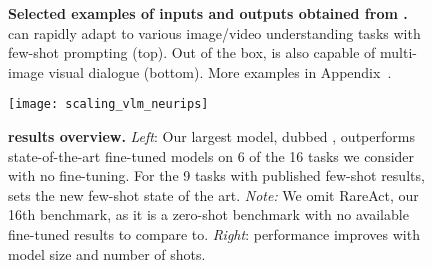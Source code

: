 \begin{figure}
{\begin{minipage}[b]{0.45\textwidth}
\end{minipage}
\begin{minipage}[b]{0.45\textwidth}
\begin{teaserdialogueenvelope}
\chatsep{}
\chatsep{}
\chatsep{}
\chatsep{}
\chatsep{}
\end{teaserdialogueenvelope}
\end{minipage}

}

\centering
\caption{\textbf{Selected examples of inputs and outputs obtained from \largemfull{}.}
\largem{} can rapidly adapt to various image/video understanding tasks with few-shot prompting (top).
Out of the box, \largem{} is also capable of multi-image visual dialogue (bottom). More examples in
Appendix~.
}
\label{fig:teaser}
\end{figure} 
\begin{figure}
    \centering
    \texttt{[image: scaling\_vlm\_neurips]}
    \caption{\capfontsize{} \textbf{\method{} results overview.} \textit{Left}: Our largest model, dubbed \largem{}, outperforms state-of-the-art fine-tuned models on 6 of the 16 tasks we consider
    with no fine-tuning.
    For the 9 tasks with published few-shot results,
    \largem{} sets the new few-shot state of the art.
    \emph{Note:} We omit RareAct, our 16th benchmark, as it is a zero-shot benchmark with no available fine-tuned results to compare to.
    \textit{Right}: \method{} performance improves with model size and number of shots.
    \vspace*{-0.4cm}
    }
    \label{fig:results}
\end{figure}

